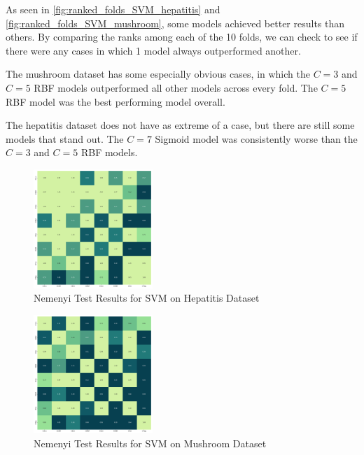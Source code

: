 As seen in \autoref{fig:ranked_folds_SVM_hepatitis} and \autoref{fig:ranked_folds_SVM_mushroom},
some models achieved better results than others. By comparing the ranks among each of the 10 folds,
we can check to see if there were any cases in which 1 model always outperformed another.

The mushroom dataset has some especially obvious cases, in which the $C=3$ and $C=5$ RBF models
outperformed all other models across every fold. The $C=5$ RBF model was the best performing model overall.

The hepatitis dataset does not have as extreme of a case, but there are still some models that stand out.
The $C=7$ Sigmoid model was consistently worse than the $C=3$ and $C=5$ RBF models.

\begin{figure}
    \centering
    \includegraphics[width=0.4\textwidth]{figures/nemenyi_test_results_SVM_hepatitis.png}
    \caption{Nemenyi Test Results for SVM on Hepatitis Dataset}
    \label{fig:nemenyi_test_results_SVM_hepatitis}
\end{figure}

\begin{figure}
    \centering
    \includegraphics[width=0.4\textwidth]{figures/nemenyi_test_results_SVM_mushroom.png}
    \caption{Nemenyi Test Results for SVM on Mushroom Dataset}
    \label{fig:nemenyi_test_results_SVM_mushroom}
\end{figure}

